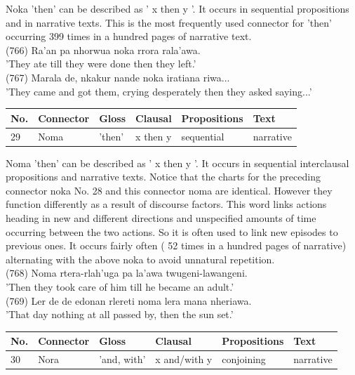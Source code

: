 \documentclass[10pt]{article}
\begin{document}
Noka 'then' can be described as ' x then y '. It occurs in sequential propositions and in narrative texts. This is the most frequently used connector for 'then' occurring 399 times in a hundred pages of narrative text.\\
(766) Ra'an pa nhorwua noka rrora rala'awa.\\
'They ate till they were done then they left.'\\
(767) Marala de, nkakur nande noka iratiana riwa...\\
'They came and got them, crying desperately then they asked saying...'

\begin{center}
\begin{tabular}{|l|l|l|l|l|l|}
\hline
No. & Connector & Gloss & Clausal & Propositions & Text \\
\hline
29 & Noma & 'then' & x then y & sequential & narrative \\
\hline
\end{tabular}
\end{center}

Noma 'then' can be described as ' x then y '. It occurs in sequential interclausal propositions and narrative texts. Notice that the charts for the preceding connector noka No. 28 and this connector noma are identical. However they function differently as a result of discourse factors. This word links actions heading in new and different directions and unspecified amounts of time occurring between the two actions. So it is often used to link new episodes to previous ones. It occurs fairly often ( 52 times in a hundred pages of narrative) alternating with the above noka to avoid unnatural repetition.\\
(768) Noma rtera-rlah'uga pa la'awa twugeni-lawangeni.\\
'Then they took care of him till he became an adult.'\\
(769) Ler de de edonan rlereti noma lera mana nheriawa.\\
'That day nothing at all passed by, then the sun set.'

\begin{center}
\begin{tabular}{|l|l|l|l|l|l|}
\hline
No. & Connector & Gloss & Clausal & Propositions & Text \\
\hline
30 & Nora & 'and, with' & x and/with y & conjoining & narrative \\
\hline
\end{tabular}
\end{center}
\end{document}
